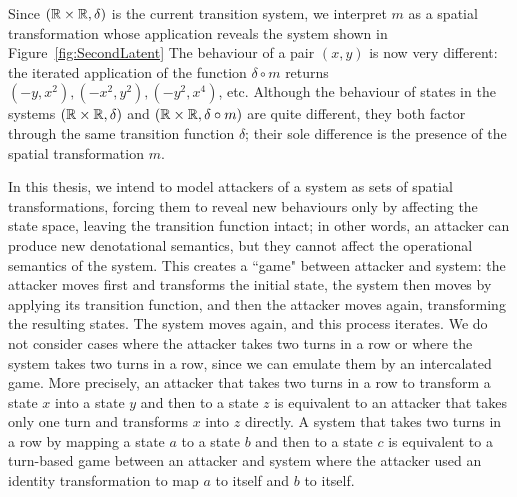 Since $(\mathbb{R}\times\mathbb{R}, \delta)$ is the current transition system, we interpret $m$ as a spatial transformation whose application reveals the system shown in Figure~\ref{fig:SecondLatent}%
The behaviour of a pair $(x,y)$ is now very different: the iterated application of the function $\delta\circ m$ returns $(-y,x^2),(-x^2,y^2),(-y^2,x^4)$, etc. Although the behaviour of states in the systems $(\mathbb{R}\times\mathbb{R}, \delta)$ and $(\mathbb{R}\times\mathbb{R}, \delta\circ m)$ are quite different, they both factor through the same transition function $\delta$; their sole difference is the presence of the spatial transformation $m$. 


In this thesis, we intend to model attackers of a system as sets of spatial transformations, forcing them to reveal new behaviours only by affecting the state space, leaving the transition function intact; in other words, an attacker can produce new denotational semantics, but they cannot affect the operational semantics of the system. This creates a ``game" between attacker and system: the attacker moves first and transforms the initial state, the system then moves by applying its transition function, and then the attacker moves again, transforming the resulting states. The system moves again, and this process iterates. We do not consider cases where the attacker takes two turns in a row or where the system takes two turns in a row, since we can emulate them by an intercalated game. More precisely, an attacker that takes two turns in a row to transform a state $x$ into a state $y$ and then to a state $z$ is equivalent to an attacker that takes only one turn and transforms $x$ into $z$ directly. A system that takes two turns in a row by mapping a state $a$ to a state $b$ and then to a state $c$ is equivalent to a turn-based game between an attacker and system where the attacker used an identity transformation to map $a$ to itself and $b$ to itself. 

